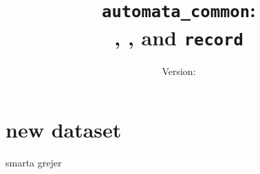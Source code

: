 \documentclass[a4paper]{report}
\title{\texttt{automata\_common}:\\ \jobtuple, \joblist, and \texttt{record}}
\author{Version: \inputfile{gitrevision}}
\date{}
\begin{document}




%

\chapter{new dataset}



%

%


%


%


%


smarta grejer



\end{document}
